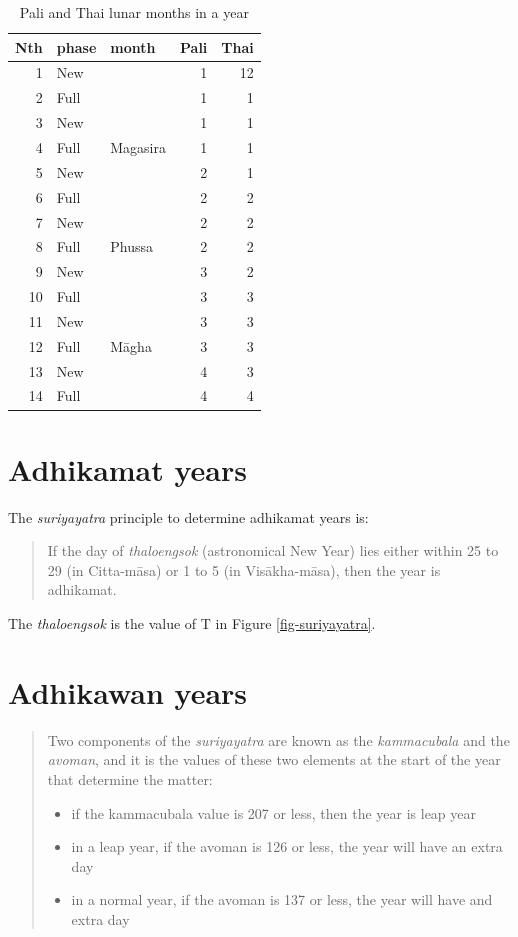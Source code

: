 \documentclass[11pt,oneside]{memoir-article}
\begin{document}
\begin{table}[p]
\caption{\label{pali-thai-year} Pali and Thai lunar months in a year}
\centering
\begin{tabular}{rllrr}
Nth & phase & month & Pali & Thai\\
\hline
1 & New &  & 1 & 12\\
2 & Full &  & 1 & 1\\
3 & New &  & 1 & 1\\
4 & Full & Magasira & 1 & 1\\
5 & New &  & 2 & 1\\
6 & Full &  & 2 & 2\\
7 & New &  & 2 & 2\\
8 & Full & Phussa & 2 & 2\\
9 & New &  & 3 & 2\\
10 & Full &  & 3 & 3\\
11 & New &  & 3 & 3\\
12 & Full & Māgha & 3 & 3\\
13 & New &  & 4 & 3\\
14 & Full &  & 4 & 4\\
\end{tabular}
\end{table}

\section{Adhikamat years}
\label{sec-4-3}
\label{adhikamat-years}

The \emph{suriyayatra} principle to determine adhikamat years is:

\begin{quote}
If the day of \emph{thaloengsok} (astronomical New Year)
lies either within 25 to 29 (in Citta-māsa) or 1 to 5 (in
Visākha-māsa), then the year is adhikamat.\cite{prasert-ngan}
\end{quote}

The \emph{thaloengsok} is the value of T in Figure \ref{fig-suriyayatra}.

\section{Adhikawan years}
\label{sec-4-4}
\label{adhikawan-years}

\begin{quote}
Two components of the \emph{suriyayatra} are known as the \emph{kammacubala} and
the \emph{avoman}, and it is the values of these two elements at the start
of the year that determine the matter:

\begin{itemize}
\item if the kammacubala value is 207 or less, then the year is leap year
\item in a leap year, if the avoman is 126 or less, the year will have an
extra day
\item in a normal year, if the avoman is 137 or less, the year will have
and extra day\cite{eade-interpolation}
\end{itemize}
\end{quote}
\end{document}

